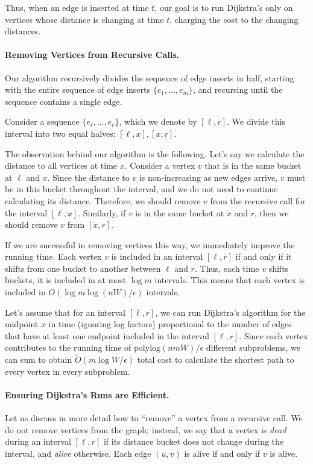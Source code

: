 \documentclass[11pt]{article}
\newcommand{\defn}{\emph}
\newcommand{\polylog}{\text{polylog}}
\begin{document}
Thus, when an edge is inserted at time $t$, our goal is to run Dijkstra's only on vertices whose distance is changing at time $t$, charging the cost to the changing distances.  

\paragraph{Removing Vertices from Recursive Calls.} 
Our algorithm recursively divides the sequence of edge inserts in half, starting with the entire sequence of edge inserts $\{e_1, \ldots, e_m\}$, and recursing until the sequence contains a single edge.   

Consider a sequence $\{e_{\ell}, \ldots, e_r\}$, which we denote by $[\ell, r]$.  We divide this interval into two equal halves: $[\ell, x], [x, r]$.  

The observation behind our algorithm is the following.  Let's say we calculate the distance to all vertices at time $x$.  Consider a vertex $v$ that is in the same bucket at $\ell$ and $x$.
Since the distance to $v$ is non-increasing as new edges arrive, $v$ must be in this bucket throughout the interval, and we do not need to continue calculating its distance. 
Therefore, we should remove $v$ from the recursive call for the interval $[\ell, x]$.  
Similarly, if $v$ is in the same bucket at $x$ and $r$, then we should remove $v$ from $[x, r]$.

If we are successful in removing vertices this way, we immediately improve the running time.  Each vertex $v$ is included in an interval $[\ell, r]$ if and only if it shifts from one bucket to another between $\ell$ and $r$.  Thus, each time $v$ shifts buckets, it is included in at most $\log m$ intervals.  This means that each vertex is included in $O(\log m \log (nW)/\epsilon)$ intervals.  
 
Let's assume that for an interval $[\ell, r]$, we can run Dijkstra's algorithm for the midpoint $x$ in time (ignoring log factors) proportional to the number of edges that have at least one endpoint included in the interval $[\ell, r]$. 
Since each vertex contributes to the running time of $\polylog(nmW)/\epsilon$ different subproblems, we can sum to obtain $\tilde{O}(m\log W/\epsilon)$ total cost to calculate the shortest path to every vertex in every subproblem.

\paragraph{Ensuring Dijkstra's Runs are Efficient.}
Let us discuss in more detail how to ``remove'' a vertex from a recursive call.
We do not remove vertices from the graph; instead, we say that a vertex is \defn{dead} during an interval $[\ell, r]$ if its distance bucket does not change during the interval, and \defn{alive} otherwise.
Each edge $(u,v)$ is alive if and only if $v$ is alive.
  
\end{document}
